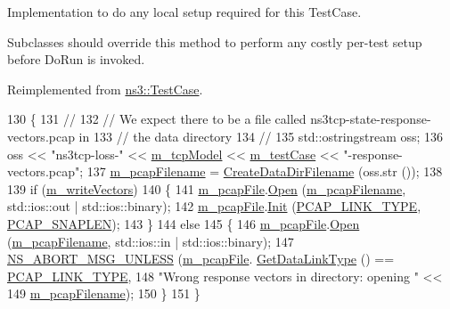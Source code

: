 Implementation to do any local setup required for this Test\+Case. 

Subclasses should override this method to perform any costly per-\/test setup before Do\+Run is invoked. 

Reimplemented from \hyperlink{classns3_1_1TestCase_a4a7e32ad32a10a508910815cd38e9177}{ns3\+::\+Test\+Case}.


\begin{DoxyCode}
130 \{
131   \textcolor{comment}{//}
132   \textcolor{comment}{// We expect there to be a file called ns3tcp-state-response-vectors.pcap in}
133   \textcolor{comment}{// the data directory}
134   \textcolor{comment}{//}
135   std::ostringstream oss;
136   oss << \textcolor{stringliteral}{"ns3tcp-loss-"} << \hyperlink{classNs3TcpLossTestCase_afbac387ba94a6b5cd8760f688bab5008}{m\_tcpModel} << \hyperlink{classNs3TcpLossTestCase_a7a8850910d9da65bebe441babd05f979}{m\_testCase} << \textcolor{stringliteral}{"-response-vectors.pcap"};
137   \hyperlink{classNs3TcpLossTestCase_ae05885e96d3f3f935e6ddfcb3f534407}{m\_pcapFilename} = \hyperlink{classns3_1_1TestCase_a3e4d216ff392a43418f26bb3e5b0f16d}{CreateDataDirFilename} (oss.str ());
138 
139   \textcolor{keywordflow}{if} (\hyperlink{classNs3TcpLossTestCase_a6b4ff8445b57a44939392bb79b00d963}{m\_writeVectors})
140     \{
141       \hyperlink{classNs3TcpLossTestCase_a6a02dbbf853025b7fe39393c1e1195ae}{m\_pcapFile}.\hyperlink{classns3_1_1PcapFile_a064e8494e28e823d0bb4e40549f9f483}{Open} (\hyperlink{classNs3TcpLossTestCase_ae05885e96d3f3f935e6ddfcb3f534407}{m\_pcapFilename}, std::ios::out | std::ios::binary);
142       \hyperlink{classNs3TcpLossTestCase_a6a02dbbf853025b7fe39393c1e1195ae}{m\_pcapFile}.\hyperlink{classns3_1_1PcapFile_a80c8adea1baa66e3f730df2927b0fc9b}{Init} (\hyperlink{ns3tcp-loss-test-suite_8cc_a1d33ea10cde9143eb9b36be021f3739e}{PCAP\_LINK\_TYPE}, \hyperlink{ns3tcp-loss-test-suite_8cc_ae9a6b49b98d0c7917dda456f6771d2e1}{PCAP\_SNAPLEN});
143     \}
144   \textcolor{keywordflow}{else}
145     \{
146       \hyperlink{classNs3TcpLossTestCase_a6a02dbbf853025b7fe39393c1e1195ae}{m\_pcapFile}.\hyperlink{classns3_1_1PcapFile_a064e8494e28e823d0bb4e40549f9f483}{Open} (\hyperlink{classNs3TcpLossTestCase_ae05885e96d3f3f935e6ddfcb3f534407}{m\_pcapFilename}, std::ios::in | std::ios::binary);
147       \hyperlink{group__fatal_ga0bd3f62c55e7347ff814572f3aaa3864}{NS\_ABORT\_MSG\_UNLESS} (\hyperlink{classNs3TcpLossTestCase_a6a02dbbf853025b7fe39393c1e1195ae}{m\_pcapFile}.
      \hyperlink{classns3_1_1PcapFile_aa3795e9a87e7a4151fb4d30747eaa072}{GetDataLinkType} () == \hyperlink{ns3tcp-loss-test-suite_8cc_a1d33ea10cde9143eb9b36be021f3739e}{PCAP\_LINK\_TYPE},
148                            \textcolor{stringliteral}{"Wrong response vectors in directory: opening "} <<
149                            \hyperlink{classNs3TcpLossTestCase_ae05885e96d3f3f935e6ddfcb3f534407}{m\_pcapFilename});
150     \}
151 \}
\end{DoxyCode}



